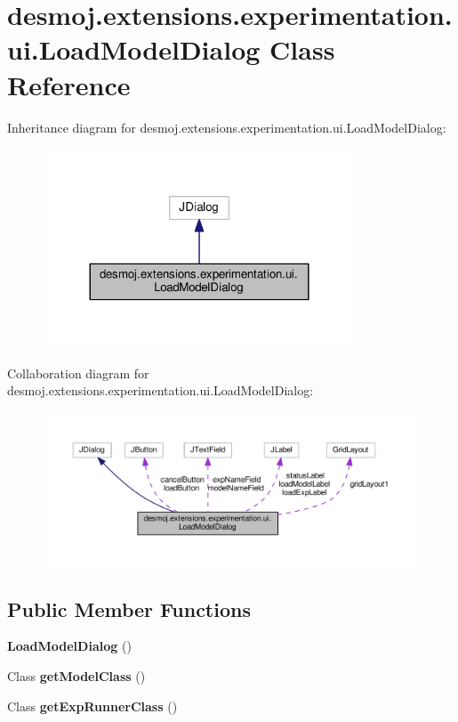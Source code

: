 \section{desmoj.\-extensions.\-experimentation.\-ui.\-Load\-Model\-Dialog Class Reference}
\label{classdesmoj_1_1extensions_1_1experimentation_1_1ui_1_1_load_model_dialog}


Inheritance diagram for desmoj.\-extensions.\-experimentation.\-ui.\-Load\-Model\-Dialog\-:
\nopagebreak
\begin{figure}[H]
\begin{center}
\leavevmode
\includegraphics[width=264pt]{classdesmoj_1_1extensions_1_1experimentation_1_1ui_1_1_load_model_dialog__inherit__graph}
\end{center}
\end{figure}


Collaboration diagram for desmoj.\-extensions.\-experimentation.\-ui.\-Load\-Model\-Dialog\-:
\nopagebreak
\begin{figure}[H]
\begin{center}
\leavevmode
\includegraphics[width=350pt]{classdesmoj_1_1extensions_1_1experimentation_1_1ui_1_1_load_model_dialog__coll__graph}
\end{center}
\end{figure}
\subsection*{Public Member Functions}
\begin{DoxyCompactItemize}
\item 
{\bf Load\-Model\-Dialog} ()
\item 
Class {\bf get\-Model\-Class} ()
\item 
Class {\bf get\-Exp\-Runner\-Class} ()
\end{DoxyCompactItemize}

